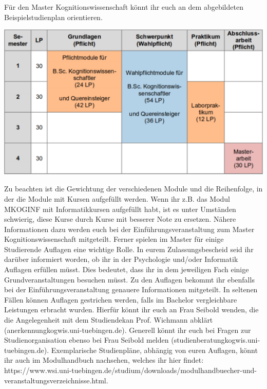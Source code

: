 \ifkogwiss
Für den Master Kognitionswissenschaft könnt ihr euch an dem abgebildeten Beispielstudienplan orientieren.
\begin{center}
	\includegraphics[width=.8\textwidth]{media/studienplan_kmsc.pdf}
\end{center}
Zu beachten ist die Gewichtung der verschiedenen Module und die Reihenfolge, in der die Module mit Kursen aufgefüllt werden. Wenn
ihr z.B. das Modul MKOGINF mit Informatikkursen aufgefüllt habt, ist es unter Umständen schwierig, diese Kurse durch Kurse mit
besserer Note zu ersetzen. Nähere Informationen dazu werden euch bei der Einführungsveranstaltung zum Master Kognitionswissenschaft mitgeteilt. Ferner spielen im Master für einige Studierende Auflagen eine wichtige Rolle. In eurem Zulassungsbescheid seid ihr darüber informiert worden, ob ihr in der Psychologie und/oder Informatik Auflagen erfüllen müsst. Dies bedeutet, dass ihr in dem jeweiligen Fach einige Grundveranstaltungen besuchen müsst. Zu den Auflagen bekommt ihr ebenfalls bei der Einführungsveranstaltung genauere Informationen mitgeteilt. In seltenen Fällen können Auflagen gestrichen werden, falls im Bachelor vergleichbare Leistungen erbracht wurden. Hierfür könnt ihr euch an Frau Seibold wenden, die die Angelegenheit mit dem Studiendekan Prof. Wichmann abklärt (anerkennung\At kogwis.uni-tuebingen.de). Generell könnt ihr euch bei Fragen zur Studienorganisation ebenso bei Frau Seibold melden (studienberatung\At kogwis.uni-tuebingen.de). Exemplarische Studienpläne, abhängig von euren Auflagen, könnt ihr auch im Modulhandbuch nachsehen, welches ihr hier findet: https://www.wsi.uni-tuebingen.de/studium/downloads/modulhandbuecher-und-veranstaltungsverzeichnisse.html.

